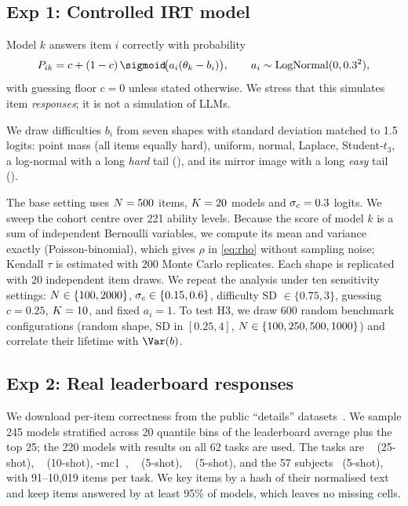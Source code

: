 \subsection{Exp 1: Controlled IRT model}
\label{sec:exp1}

 Model $k$ answers item $i$ correctly with probability
\begin{equation}
P_{ik} = c + (1-c)\,\sigmoid\!\big(a_i(\theta_k - b_i)\big), \qquad a_i \sim \mathrm{LogNormal}(0, 0.3^2),
\label{eq:irt}
\end{equation}
with guessing floor $c = 0$ unless stated otherwise. We stress that this simulates item {\em responses}; it is not a simulation of LLMs.

 We draw difficulties $b_i$ from seven shapes with standard deviation matched to 1.5 logits: point mass (all items equally hard), uniform, normal, Laplace, Student-$t_3$, a log-normal with a long {\em hard} tail (\lnhard), and its mirror image with a long {\em easy} tail (\lneasy).

 The base setting uses $N = 500$ items, $K = 20$ models and $\sigma_{c} = 0.3$ logits. We sweep the cohort centre over 221 ability levels. Because the score of model $k$ is a sum of independent Bernoulli variables, we compute its mean and variance exactly (Poisson-binomial), which gives $\rho$ in \eqref{eq:rho} without sampling noise; Kendall $\tau$ is estimated with 200 Monte Carlo replicates. Each shape is replicated with 20 independent item draws. We repeat the analysis under ten sensitivity settings: $N \in \{100, 2000\}$, $\sigma_{c} \in \{0.15, 0.6\}$, difficulty SD $\in \{0.75, 3\}$, guessing $c = 0.25$, $K = 10$, and fixed $a_i = 1$. To test H3, we draw 600 random benchmark configurations (random shape, SD in $[0.25, 4]$, $N \in \{100, 250, 500, 1000\}$) and correlate their lifetime with $\Var(b)$.

\subsection{Exp 2: Real leaderboard responses}
\label{sec:exp2}

 We download per-item correctness from the public \leaderboard ``details'' datasets~\citep{beeching2023open}. We sample 245 models stratified across 20 quantile bins of the leaderboard average plus the top 25; the 220 models with results on all 62 tasks are used. The tasks are \arcc~\citep{clark2018think} (25-shot), \hellaswag~\citep{zellers2019hellaswag} (10-shot), \truthfulqa-mc1~\citep{lin2022truthfulqa}, \winogrande~\citep{sakaguchi2020winogrande} (5-shot), \gsm~\citep{cobbe2021training} (5-shot), and the 57 \mmlu subjects~\citep{hendrycks2021measuring} (5-shot), with 91--10{,}019 items per task. We key items by a hash of their normalised text and keep items answered by at least 95\% of models, which leaves no missing cells.

